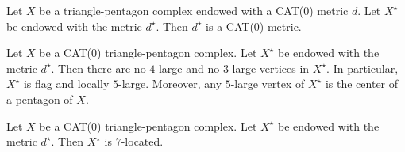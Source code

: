 \documentclass[10pt,a4paper]{amsart}
\begin{document}
\begin{lemma}\label{3.1}
Let $X$ be a triangle-pentagon complex endowed with a CAT(0) metric $d$. Let $X^{\star}$ be endowed with the metric $d^{\star}$. Then $d^{\star}$ is a CAT(0) metric.
\end{lemma}

\begin{lemma}\label{3.2}
Let $X$ be a CAT(0) triangle-pentagon complex.  Let $X^{\star}$ be endowed with the metric $d^{\star}$.  Then there are no $4$-large and no $3$-large vertices in $X^{\star}$. In particular, $X^{\star}$ is flag and locally $5$-large. Moreover, any $5$-large vertex of $X^{\star}$ is the center of a pentagon of $X$.
\end{lemma}

\begin{theorem}\label{3.3}
Let $X$ be a CAT(0) triangle-pentagon complex.  Let $X^{\star}$ be endowed with the metric $d^{\star}$. Then $X^{\star}$ is $7$-located. 
\end{theorem}
\end{document}

